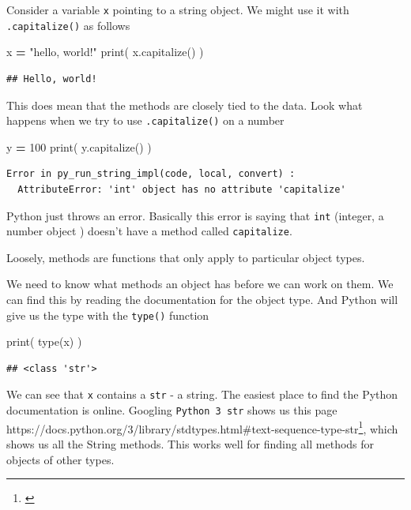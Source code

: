 \documentclass[]{book}
\newenvironment{Shaded}{\begin{snugshade}}{\end{snugshade}}
\newcommand{\BuiltInTok}[1]{#1}
\newcommand{\DecValTok}[1]{\textcolor[rgb]{0.00,0.00,0.81}{#1}}
\newcommand{\NormalTok}[1]{#1}
\newcommand{\OperatorTok}[1]{\textcolor[rgb]{0.81,0.36,0.00}{\textbf{#1}}}
\newcommand{\StringTok}[1]{\textcolor[rgb]{0.31,0.60,0.02}{#1}}
\let\rmarkdownfootnote\footnote%
\def\footnote{\protect\rmarkdownfootnote}
\renewcommand{\href}[2]{#2\footnote{\url{#1}}}
\theoremstyle{definition}
\theoremstyle{definition}
\theoremstyle{definition}
\theoremstyle{remark}
\begin{document}
Consider a variable \texttt{x} pointing to a string object. We might use
it with \texttt{.capitalize()} as follows

\begin{Shaded}
\begin{Highlighting}[]
\NormalTok{x }\OperatorTok{=} \StringTok{"hello, world!"}
\BuiltInTok{print}\NormalTok{( x.capitalize() )}
\end{Highlighting}
\end{Shaded}

\begin{verbatim}
## Hello, world!
\end{verbatim}

This does mean that the methods are closely tied to the data. Look what
happens when we try to use \texttt{.capitalize()} on a number

\begin{Shaded}
\begin{Highlighting}[]
\NormalTok{y }\OperatorTok{=} \DecValTok{100}
\BuiltInTok{print}\NormalTok{( y.capitalize() )}
\end{Highlighting}
\end{Shaded}

\begin{verbatim}
Error in py_run_string_impl(code, local, convert) : 
  AttributeError: 'int' object has no attribute 'capitalize'
\end{verbatim}

Python just throws an error. Basically this error is saying that
\texttt{int} (integer, a number object ) doesn't have a method called
\texttt{capitalize}.

Loosely, methods are functions that only apply to particular object
types.

We need to know what methods an object has before we can work on them.
We can find this by reading the documentation for the object type. And
Python will give us the type with the \texttt{type()} function

\begin{Shaded}
\begin{Highlighting}[]
\BuiltInTok{print}\NormalTok{( }\BuiltInTok{type}\NormalTok{(x) )}
\end{Highlighting}
\end{Shaded}

\begin{verbatim}
## <class 'str'>
\end{verbatim}

We can see that \texttt{x} contains a \texttt{str} - a string. The
easiest place to find the Python documentation is online. Googling
\texttt{Python\ 3\ str} shows us this page
\href{}{https://docs.python.org/3/library/stdtypes.html\#text-sequence-type-str},
which shows us all the String methods. This works well for finding all
methods for objects of other types.
\end{document}
